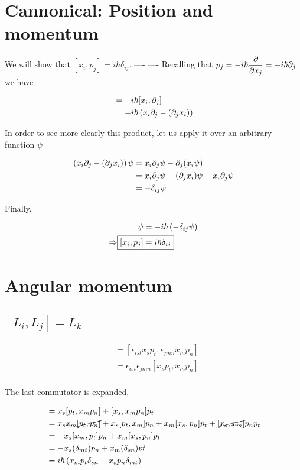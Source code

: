 \section{Cannonical: Position and momentum}
We will show that $[x_i,p_j] = i\hbar\delta_{ij}$.
---- ----
Recalling that $p_j = -i \hbar \dfrac{\partial }{\partial x_j} = -i\hbar \partial_j$  we have

\begin{align}
	[x_i, p_j] &= -i\hbar [x_i, \del_j] \\
			&= -i\hbar \paren{x_i \del_j - (\del_jx_i)}
\end{align}

In order to see more clearly this product, let us apply it over an arbitrary function $\psi$ %



\begin{align}
	\left(x_i \partial_j - (\partial_jx_i)\right)\psi &= x_i \partial_j\psi - \partial_j(x_i \psi) \\
		&= x_i \partial_j\psi - (\partial_j x_i) \psi - x_i \partial_j \psi \\
		&= -\delta_{ij}\psi
\end{align}

Finally, 

\begin{align}
	[x_i, p_j]\psi &= -i\hbar\paren{-\delta_{ij}\psi} \\
	\Rightarrow \Aboxed{[x_i, p_j] &= i\hbar\delta_{ij}}
\end{align}


\section{Angular momentum}
\subsection{$[L_i,L_j] = L_k$}


\begin{align}
	[L_i,L_j] &= [ \epsilon_{ist}x_s p_t , \epsilon_{jmn}x_m p_n ] \\
		&= \epsilon_{ist}\epsilon_{jmn}[ x_s p_t , x_m p_n ] \\
\end{align}



The last commutator is expanded,

\begin{align}
	[ x_s p_t, x_m p_n ] &= x_s [  p_t, x_m p_n ] + [ x_s, x_m p_n ] p_t\\
		&= x_s x_m \cancel{[  p_t, p_n ]} + x_s [  p_t, x_m ]p_n  + x_m [ x_s, p_n ] p_t + \cancel{[ x_s, x_m ]}p_n p_t \\
		&= -x_s [x_m, p_t]p_n + x_m[ x_s, p_n]p_t \\
		&= -x_s(\delta_{mt})p_n + x_m(\delta_{sn})pt \\
		&= i\hbar \paren{x_m p_t \delta_{sn} - x_s p_n \delta_{mt}}
\end{align}

